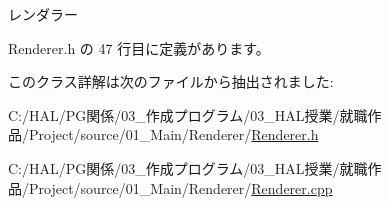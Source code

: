 レンダラー 



 Renderer.\+h の 47 行目に定義があります。



このクラス詳解は次のファイルから抽出されました\+:\begin{DoxyCompactItemize}
\item 
C\+:/\+H\+A\+L/\+P\+G関係/03\+\_\+作成プログラム/03\+\_\+\+H\+A\+L授業/就職作品/\+Project/source/01\+\_\+\+Main/\+Renderer/\mbox{\hyperlink{_renderer_8h}{Renderer.\+h}}\item 
C\+:/\+H\+A\+L/\+P\+G関係/03\+\_\+作成プログラム/03\+\_\+\+H\+A\+L授業/就職作品/\+Project/source/01\+\_\+\+Main/\+Renderer/\mbox{\hyperlink{_renderer_8cpp}{Renderer.\+cpp}}\end{DoxyCompactItemize}

